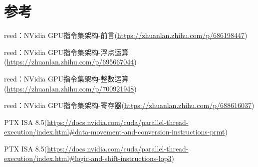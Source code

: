 \section{参考}

reed：NVidia GPU指令集架构-前言(\url{https://zhuanlan.zhihu.com/p/686198447})

reed：NVidia GPU指令集架构-浮点运算(\url{https://zhuanlan.zhihu.com/p/695667044})

reed：NVidia GPU指令集架构-整数运算(\url{https://zhuanlan.zhihu.com/p/700921948})

reed：NVidia GPU指令集架构-寄存器(\url{https://zhuanlan.zhihu.com/p/688616037})

PTX ISA 8.5(\url{https://docs.nvidia.com/cuda/parallel-thread-execution/index.html#data-movement-and-conversion-instructions-prmt})

PTX ISA 8.5(\url{https://docs.nvidia.com/cuda/parallel-thread-execution/index.html#logic-and-shift-instructions-lop3})

